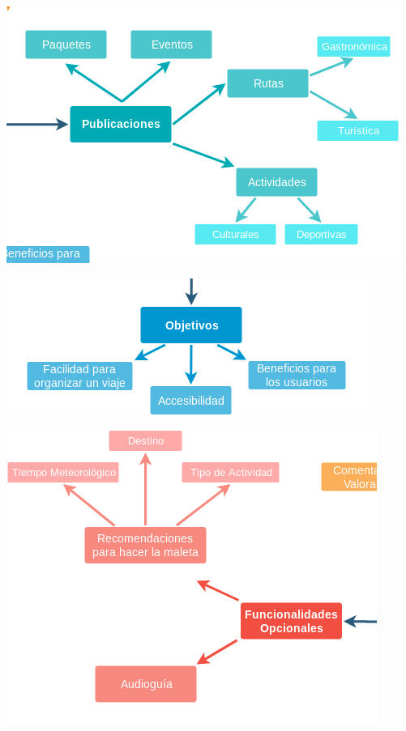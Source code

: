 \documentclass[spanish]{beamer}
\begin{document}
\begin{frame}
	\begin{center}
		\includegraphics[scale=0.7]{../Imagenes/MM2p1}
	\end{center}
\end{frame}

\begin{frame}
	\begin{center}
		\includegraphics[scale=0.75]{../Imagenes/MM3p1}
	\end{center}
\end{frame}

\begin{frame}
	\begin{center}
		\includegraphics[scale=0.6]{../Imagenes/MM4p1}
	\end{center}
\end{frame}
\end{document}
